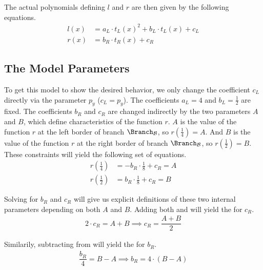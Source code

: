 The actual polynomials defining $l$ and $r$ are then given by the following equations.
\begin{align}
    l(x) & = a_L \cdot t_L(x)^2 + b_L \cdot t_L(x) + c_L \\
    r(x) & = b_R \cdot t_R(x) + c_R
    \label{equ:final.def.r}
\end{align}

\subsection{The Model Parameters}

To get this model to show the desired behavior, we only change the coefficient $c_L$ directly via the parameter $p_y$ ($c_L = p_y$).
The coefficients $a_L = 4$ and $b_L = \frac{1}{2}$ are fixed.
The coefficients $b_R$ and $c_R$ are changed indirectly by the two parameters $A$ and $B$, which define characteristics of the function $r$.
$A$ is the value of the function $r$ at the left border of branch $\Branch_\B$, so $r(\frac{1}{4}) = A$.
And $B$ is the value of the function $r$ at the right border of branch $\Branch_\B$, so $r(\frac{1}{2}) = B$.
These constraints will yield the following set of equations.
\begin{subequations}
    \begin{align}
        r\left(\frac{1}{4}\right) & = - b_R \cdot \frac{1}{8} + c_R = A
        \label{equ:final.def.param.constr.A}
        \\
        r\left(\frac{1}{2}\right) & = b_R \cdot \frac{1}{8} + c_R = B
        \label{equ:final.def.param.constr.B}
    \end{align}
\end{subequations}

Solving for $b_R$ and $c_R$ will give us explicit definitions of these two internal parameters depending on both $A$ and $B$.
Adding both  and  will yield the  for $c_R$.
\begin{align}
    2 \cdot c_R = A + B \implies c_R = \dfrac{A + B}{2}
    \label{equ:final.def.param.cR}
\end{align}

Similarily, subtracting  from  will yield the  for $b_R$.
\begin{align}
    \dfrac{b_R}{4} = B - A \implies b_R = 4 \cdot (B - A)
    \label{equ:final.def.param.bR}
\end{align}

